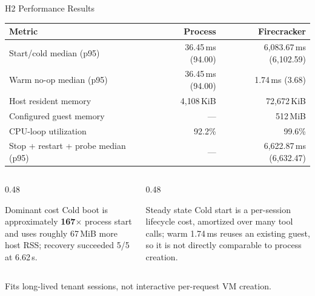\documentclass[aspectratio=169,11pt]{beamer}
\begin{document}
\begin{frame}{H2 Performance Results}
  \scriptsize
  \renewcommand{\arraystretch}{1.16}
  \setlength{\tabcolsep}{4pt}
  \begin{tabular}{lrr}
    \toprule
    \textbf{Metric} & \textbf{Process} & \textbf{Firecracker} \\
    \midrule
    Start/cold median (p95) & 36.45\,ms (94.00) & 6{,}083.67\,ms (6{,}102.59) \\
    Warm no-op median (p95) & 36.45\,ms (94.00) & 1.74\,ms (3.68) \\
    Host resident memory & 4{,}108\,KiB & 72{,}672\,KiB \\
    Configured guest memory & --- & 512\,MiB \\
    CPU-loop utilization & 92.2\% & 99.6\% \\
    Stop + restart + probe median (p95) & --- & 6{,}622.87\,ms (6{,}632.47) \\
    \bottomrule
  \end{tabular}
  \vspace{0.24cm}
  \begin{columns}[T,totalwidth=\textwidth]
    \begin{column}{0.48\textwidth}
      \begin{alertblock}{Dominant cost}
        Cold boot is approximately \textbf{167$\times$} process start and uses
        roughly 67\,MiB more host RSS; recovery succeeded 5/5 at 6.62\,s.
      \end{alertblock}
    \end{column}
    \begin{column}{0.48\textwidth}
      \begin{exampleblock}{Steady state}
        Cold start is a per-session lifecycle cost, amortized over many tool
        calls; warm 1.74\,ms reuses an existing guest, so it is not directly
        comparable to process creation.
      \end{exampleblock}
    \end{column}
  \end{columns}
  \vspace{0.12cm}
  \centering
  Fits long-lived tenant sessions, not interactive per-request VM creation.
\end{frame}
\end{document}
